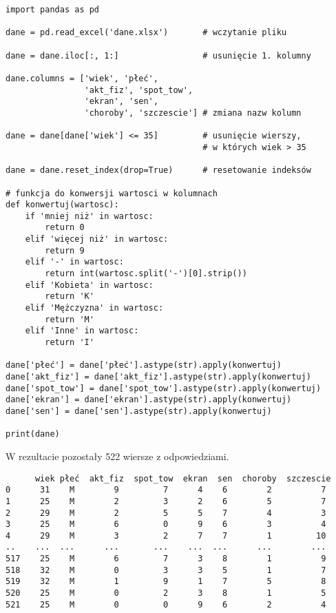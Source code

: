 \documentclass[12pt,a4paper]{article}
\begin{document}
\vspace{3mm}
\begin{lstlisting}
import pandas as pd

dane = pd.read_excel('dane.xlsx')       # wczytanie pliku

dane = dane.iloc[:, 1:]                 # usunięcie 1. kolumny

dane.columns = ['wiek', 'płeć', 
                'akt_fiz', 'spot_tow',
                'ekran', 'sen', 
                'choroby', 'szczescie'] # zmiana nazw kolumn

dane = dane[dane['wiek'] <= 35]         # usunięcie wierszy, 
                                        # w których wiek > 35

dane = dane.reset_index(drop=True)      # resetowanie indeksów

# funkcja do konwersji wartosci w kolumnach
def konwertuj(wartosc):
    if 'mniej niż' in wartosc:
        return 0
    elif 'więcej niż' in wartosc:
        return 9
    elif '-' in wartosc:
        return int(wartosc.split('-')[0].strip())
    elif 'Kobieta' in wartosc:
        return 'K'
    elif 'Mężczyzna' in wartosc:
        return 'M'
    elif 'Inne' in wartosc:
        return 'I'

dane['płeć'] = dane['płeć'].astype(str).apply(konwertuj)
dane['akt_fiz'] = dane['akt_fiz'].astype(str).apply(konwertuj)
dane['spot_tow'] = dane['spot_tow'].astype(str).apply(konwertuj)
dane['ekran'] = dane['ekran'].astype(str).apply(konwertuj)
dane['sen'] = dane['sen'].astype(str).apply(konwertuj)

print(dane)
\end{lstlisting}

\newpage W rezultacie pozostały 522 wiersze z odpowiedziami.

\begin{lstlisting}
      wiek płeć  akt_fiz  spot_tow  ekran  sen  choroby  szczescie
0      31    M        9         7      4    6        2          7
1      25    M        2         3      2    6        5          7
2      29    M        2         5      5    7        4          3
3      25    M        6         0      9    6        3          4
4      29    M        3         2      7    7        1         10
..    ...  ...      ...       ...    ...  ...      ...        ...
517    25    M        6         7      3    8        1          9
518    32    M        0         3      3    5        1          7
519    32    M        1         9      1    7        5          8
520    25    M        0         2      3    8        1          5
521    25    M        0         0      9    6        2          4
\end{lstlisting}
\end{document}
